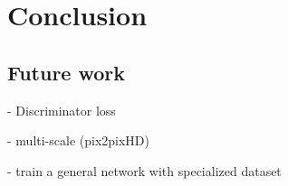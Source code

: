 \chapter{Conclusion}
\section{Future work}
- Discriminator loss

- multi-scale (pix2pixHD)

- train a general network with specialized dataset
